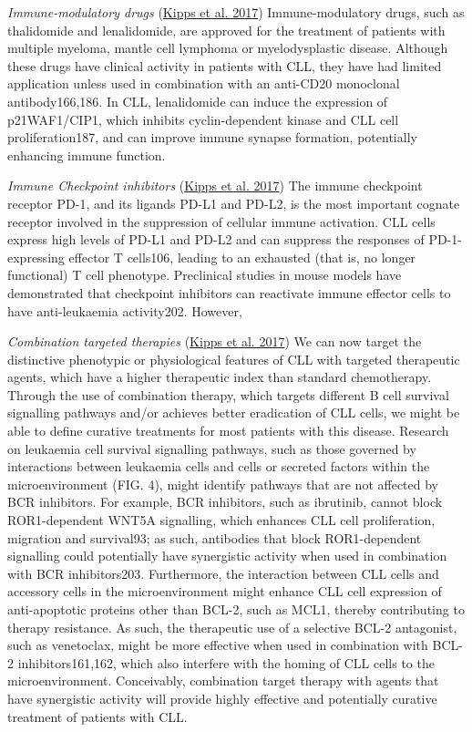 \documentclass[11pt, a4paper, twosided]{book}
\begin{document}
\emph{Immune-modulatory drugs}
(\protect\hyperlink{ref-Kipps2017}{Kipps et al. 2017})
Immune-modulatory drugs, such as thalidomide and lenalidomide, are approved for the treatment of patients with multiple myeloma, mantle cell lymphoma or myelodysplastic disease. Although these drugs have clinical activity in patients with CLL, they have had limited application unless used in combination with an anti-CD20 monoclonal antibody166,186. In CLL, lenalidomide can induce the expression of p21WAF1/CIP1, which inhibits cyclin-dependent kinase and CLL cell proliferation187, and can improve immune synapse formation, potentially enhancing immune function.

\emph{Immune Checkpoint inhibitors}
(\protect\hyperlink{ref-Kipps2017}{Kipps et al. 2017})
The immune checkpoint receptor PD-1, and its ligands PD-L1 and PD-L2, is the most important cognate receptor involved in the suppression of cellular immune activation. CLL cells express high levels of PD-L1 and PD-L2 and can suppress the responses of PD-1- expressing effector T cells106, leading to an exhausted (that is, no longer functional) T cell phenotype. Preclinical studies in mouse models have demonstrated that checkpoint inhibitors can reactivate immune effector cells to have anti-leukaemia activity202. However,

\emph{Combination targeted therapies}
(\protect\hyperlink{ref-Kipps2017}{Kipps et al. 2017})
We can now target the distinctive phenotypic or physiological features of CLL with targeted therapeutic agents, which have a higher therapeutic index than standard chemotherapy. Through the use of combination therapy, which targets different B cell survival signalling pathways and/or achieves better eradication of CLL cells, we might be able to define curative treatments for most patients with this disease.
Research on leukaemia cell survival signalling pathways, such as those governed by interactions between leukaemia cells and cells or secreted factors within the microenvironment (FIG. 4), might identify pathways that are not affected by BCR inhibitors. For example, BCR inhibitors, such as ibrutinib, cannot block ROR1-dependent WNT5A signalling, which enhances CLL cell proliferation, migration and survival93; as such, antibodies that block ROR1-dependent signalling could potentially have synergistic activity when used in combination with BCR inhibitors203. Furthermore, the interaction between CLL cells and accessory cells in the microenvironment might enhance CLL cell expression of anti-apoptotic proteins other than BCL-2, such as MCL1, thereby contributing to therapy resistance. As such, the therapeutic use of a selective BCL-2 antagonist, such as venetoclax, might be more effective when used in combination with BCL-2 inhibitors161,162, which also interfere with the homing of CLL cells to the microenvironment. Conceivably, combination target therapy with agents that have synergistic activity will provide highly effective and potentially curative treatment of patients with CLL.
\end{document}
